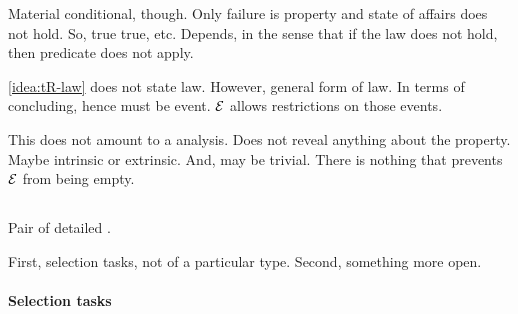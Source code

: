 \begin{note}
{    Material conditional, though.
    Only failure is property and state of affairs does not hold.
    So, true true, etc.
  }
  Depends, in the sense that if the law does not hold, then predicate does not apply.

  \autoref{idea:tR-law} does not state law.
  However, general form of law.
  In terms of concluding, hence must be event.
  \({\cal E}\) allows restrictions on those events.

  This does not amount to a analysis.
  Does not reveal anything about the property.
  Maybe intrinsic or extrinsic.
  And, may be trivial.
  There is nothing that prevents \({\cal E}\) from being empty.
\end{note}

\subsection{}
\label{sec:illu3-1}

\begin{note}
  Pair of detailed .

  First, selection tasks, not \dtC{} of a particular type.
  Second, something more open.
\end{note}

\paragraph*{Selection tasks}
\nocite{Wason:1968aa}
\nocite{Wason:1971aa}

